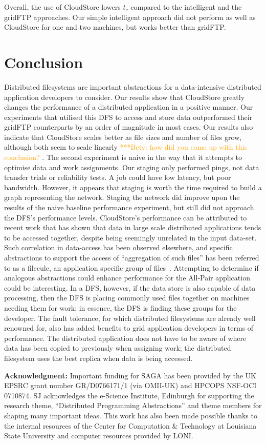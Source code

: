 \documentclass{rspublic}
\newcommand{\betynote}[1]{ {\textcolor{orange} { ***Bety: #1 }}}
\begin{document}
Overall, the use of CloudStore lowers
$t_c$ compared to the intelligent and the gridFTP approaches. Our
simple intelligent approach did not perform as well as CloudStore for one and two machines, but
works better than gridFTP. 

\section{Conclusion} Distributed filesystems are important abstractions for a data-intensive
distributed application developers to consider. Our results show that CloudStore 
greatly changes the
performance of a distributed application in a positive manner. Our
experiments that utilised this DFS to access and store data outperformed
their gridFTP counterparts by an order of magnitude in most cases. Our
results also indicate that CloudStore scales better as file sizes and
number of files grow, although both seem to scale linearly \betynote{how did you
 come up with this conclusion?}.  The second experiment is naive in the way
that it attempts to optimise data and work assignments. Our staging
only performed pings, not data transfer trials or reliability tests. A
job could have low latency, but poor bandwidth. However, it appears that staging is 
worth the time required to build a graph representing the
network. Staging the network
did improve upon the results of the naive baseline performance experiment, but still
did not approach the DFS's performance levels. CloudStore's
performance can be attributed to recent work that has shown that data in
large scale distributed applications tends to be accessed together,
despite being seemingly unrelated in the input data-set. Such
correlation in data-access has been observed elsewhere, and specific
abstractions to support the access of ``aggregation of such files'' has
been referred to as a filecule, an application specific group of
files~\cite{filecule}. Attempting to determine if analogous
abstractions could enhance performance for the All-Pair application
could be interesting. In a DFS, however, if the data store is also
capable of data processing, then the DFS is placing commonly used files
together on machines needing them for work; in essence, the DFS is
finding these groups for the developer. The fault tolerance, for which
distributed filesystems are already well renowned for, also has added
benefits to grid application developers in terms of performance. The
distributed application does not have to be aware of where data has been
copied to previously when assigning work; the distributed filesystem
uses the best replica when data is being accessed.

{\bf Acknowledgment:} Important funding for SAGA has been provided by
the UK EPSRC grant number GR/D0766171/1 (via OMII-UK) and HPCOPS
NSF-OCI 0710874. SJ acknowledges the e-Science Institute, Edinburgh
for supporting the research theme, ``Distributed Programming
Abstractions'' and theme members for shaping many important
ideas. This work has also been made possible thanks to the internal
resources of the Center for Computation \& Technology at Louisiana
State University and computer resources provided by LONI. 

%
 

\end{document}
